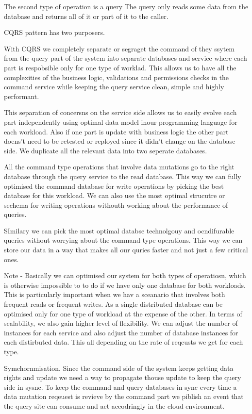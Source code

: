 \documentclass[a4paper, 11pt]{book}
\begin{document}
{    The second type of operation is a query
    The query only reads some data from the database and returns all of it or part of it to the caller.

    CQRS pattern has two purposers.

    With CQRS we completely separate or segraget the command of they ssytem from the query part of the system into separate databases and service where each part is respobsible only for one type of worklad.
    This allows us to have all the complexities of the business logic, validations and permissions checks in the command service while keeping the query service clean, simple and highly performant.

    This separation of concersns on the service side allows us to easily evolve each part independently using optimal data model inour programming language for each workload.
    Also if one part is update with business logic the other part doens't need to be retested or reployed since it didn't change on the database side.
    We duplicate all the relevant data into two seperate databases.

    All the command type operations that involve data mutations go to the right database through the query service to the read database.
    This way we can fully optimised the command database for write operations by picking the best database for this workload.
    We can also use the most optimal strucutre or sechema for writing operations withouth working about the performance of queries.

    SImilary we can pick the most optimal databse technolgouy and ocndifurable queries without worrying about the command type operations.
    This way we can store our data in a way that makes all our quries faster and not just a few critical ones.

    Note - Basically we can optimised our system for both types of operatiosn, which is otherwise impossible to to do if we have only one database for both workloads.
    This is particularly important when we hav a sceanario that involves both frequent reads or frequent writes.
    As a single distributed database can be optimised only for one type of workload at the expense of the other.
    In terms of scalability, we also gain higher level of flexibility.
    We can adjust the number of instances for each service and also adjust the number of database instances for each distirbuted data.
    This all depending on the rate of reqeusts we get for each type.


    Symchornmisation.
    Since the command side of the system keeps getting data rights and update we need a way to propagate thouse update to keep the query side in sysnc.
    To keep the command and query databases in sync every time a data mutation reqeuest is revieve by the command part we piblish an event that the query site can consume and act accodringly in the cloud environment.

}
\end{document}
